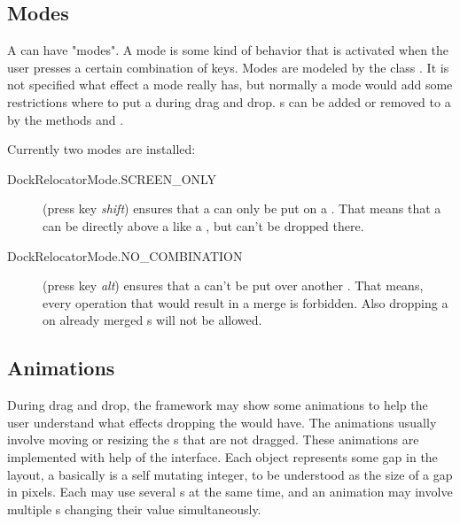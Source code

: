 
\subsection{Modes}
A  can have "modes". A mode is some kind of behavior that is activated when the user presses a certain combination of keys. Modes are modeled by the class . It is not specified what effect a mode really has, but normally a mode would add some restrictions where to put a  during drag and drop. s can be added or removed to a  by the methods  and .

Currently two modes are installed:
\begin{description}
\item[DockRelocatorMode.SCREEN\_ONLY] (press key \textit{shift}) ensures that a \linebreak {} can only be put on a . That means that a  can be directly above a  like a , but can't be dropped there.
\item[DockRelocatorMode.NO\_COMBINATION] (press key \textit{alt}) ensures that a  can't be put over another . That means, every operation that would result in a merge is forbidden. Also dropping a  on already merged s will not be allowed.
\end{description}


\subsection{Animations}
During drag and drop, the framework may show some animations to help the user understand what effects dropping the  would have. The animations usually involve moving or resizing the s that are not dragged. These animations are implemented with help of the  interface. Each  object represents some gap in the layout, a  basically is a self mutating integer, to be understood as the size of a gap in pixels. Each  may use several s at the same time, and an animation may involve multiple s changing their value simultaneously.

